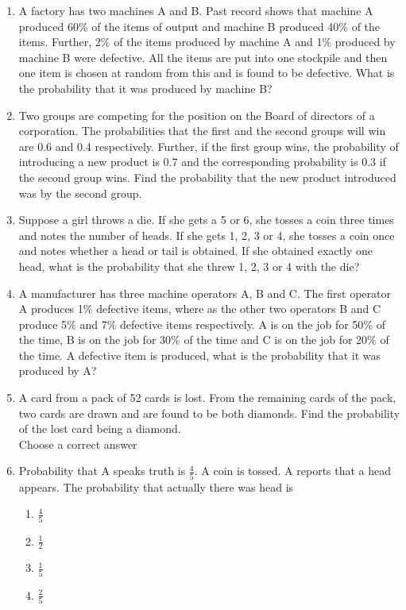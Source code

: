 \begin{enumerate}[label=\arabic*.,ref=\thesubsection.\theenumi]
\item A factory has two machines A and B. Past record shows that machine A produced 60$\%$ of the items of output and machine B produced 40$\%$ of the items. Further, 2$\%$ of the items produced by machine A and 1$\%$ produced by machine B were defective. All the items are put into one stockpile and then one item is chosen at random from this and is found to be defective. What is the probability that it was produced by machine B?\\

\item Two groups are competing for the position on the Board of directors of a corporation. The probabilities that the first and the second groups will win are 0.6 and 0.4 respectively. Further, if the first group wins, the probability of introducing a new product is 0.7 and the corresponding probability is 0.3 if the second group wins. Find the probability that the new product introduced was by the second group.\\

\item Suppose a girl throws a die. If she gets a 5 or 6, she tosses a coin three times and notes the number of heads. If she gets 1, 2, 3 or 4, she tosses a coin once and notes whether a head or tail is obtained. If she obtained exactly one head, what is the probability that she threw 1, 2, 3 or 4 with the die?\\

\item A manufacturer has three machine operators A, B and C. The first operator A
produces 1$\%$ defective items, where as the other two operators B and C produce 5$\%$ and 7$\%$ defective items respectively. A is on the job for 50$\%$ of the time, B is on the job for 30$\%$ of the time and C is on the job for 20$\%$ of the time. A defective item is produced, what is the probability that it was produced by A?\\

\item A card from a pack of 52 cards is lost. From the remaining cards of the pack, two cards are drawn and are found to be both diamonds. Find the probability of the lost card being a diamond.\\

Choose a correct answer\\
\item Probability that A speaks truth is $\frac{4}{5}$. A coin is tossed. A reports that a head appears. The probability that actually there was head is\\
\begin{enumerate}
\item $\frac{4}{5}$
\item $\frac{1}{2}$
\item $\frac{1}{5}$
\item $\frac{2}{5}$
\end{enumerate}


\end{enumerate}
